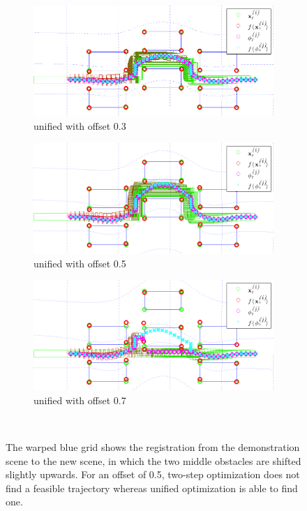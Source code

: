\begin{figure}
\begin{subfigure}[b]{.32\textwidth}
\includegraphics[width=\textwidth]{joint_offset0-30_cropped}
\caption*{unified with offset 0.3}
\end{subfigure}
\begin{subfigure}[b]{.32\textwidth}
\includegraphics[width=\textwidth]{joint_offset0-50_cropped}
\caption*{unified with offset 0.5}
\end{subfigure}
\begin{subfigure}[b]{.32\textwidth}
\includegraphics[width=\textwidth]{joint_offset0-70_cropped}
\caption*{unified with offset 0.7}
\end{subfigure}\\
\caption{The warped blue grid shows the registration from the demonstration scene to the new scene, in which the two middle obstacles are shifted slightly upwards. For an offset of 0.5, two-step optimization does not find a feasible trajectory whereas unified optimization is able to find one.}
\label{fig:scopey_results}
\end{figure}


